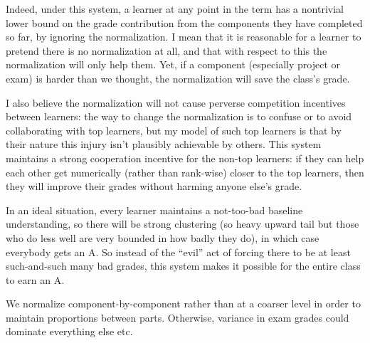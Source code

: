 \documentclass[12pt]{article}
\begin{document}
        Indeed, under this system, a learner at any point in the term has a
        nontrivial lower bound on the grade contribution from the components
        they have completed so far, by ignoring the normalization.  I mean that
        it is reasonable for a learner to pretend there is no normalization at
        all, and that with respect to this the normalization will only help
        them.  Yet, if a component (especially project or exam) is harder than
        we thought, the normalization will save the class's grade.

        I also believe the normalization will not cause perverse competition
        incentives between learners: the way to change the normalization is to
        confuse or to avoid collaborating with top learners, but my model of
        such top learners is that by their nature this injury isn't plausibly
        achievable by others.  This system maintains a strong cooperation
        incentive for the non-top learners: if they can help each other get
        numerically (rather than rank-wise) closer to the top learners, then
        they will improve their grades without harming anyone else's grade.

        In an ideal situation, every learner maintains a not-too-bad baseline
        understanding, so there will be strong clustering (so heavy upward tail
        but those who do less well are very bounded in how badly they do), in
        which case everybody gets an A.
        So instead of the ``evil'' act of forcing there to be at least
        such-and-such many bad grades, this system makes it possible for the
        entire class to earn an A.

        We normalize component-by-component rather than at a coarser level
        in order to maintain proportions between parts.  Otherwise, variance
        in exam grades could dominate everything else etc.
\end{document}
